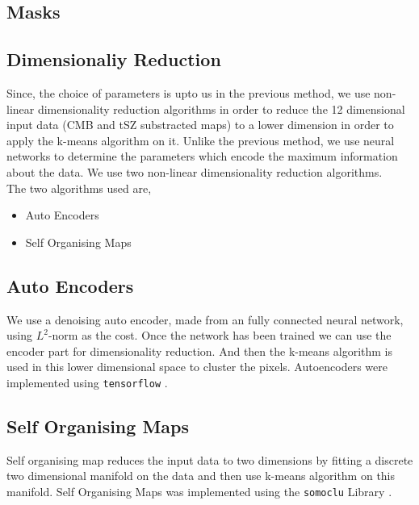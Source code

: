 \subsection{Masks}
\subsection{Dimensionaliy Reduction}
Since, the choice of parameters is upto us in the previous method, we use non-linear dimensionality
reduction algorithms in order to reduce the 12 dimensional input data (CMB and tSZ
substracted maps) to a lower dimension in order to
apply the k-means algorithm on it. Unlike the previous method,
we use neural networks to determine the
parameters which encode the maximum information about the data.
We use two non-linear dimensionality
reduction algorithms.\\
The two algorithms used are, 
\begin{itemize}
  \item Auto Encoders
  \item Self Organising Maps
\end{itemize}

\subsection{Auto Encoders}
We use a denoising auto encoder, made from an fully connected neural network, using $L^2$-norm as
the cost.
Once the network has been trained we can use the encoder part for dimensionality reduction.
And then the k-means algorithm is used in this lower dimensional space to cluster the pixels.
Autoencoders were implemented using \texttt{tensorflow} \cite{tensorflow}.
\subsection{Self Organising Maps}
Self organising map reduces the input data to two dimensions by fitting a discrete two dimensional
manifold on the data and then use k-means algorithm on this manifold.
Self Organising Maps was implemented using the \texttt{somoclu} Library \cite{somoclu}.

